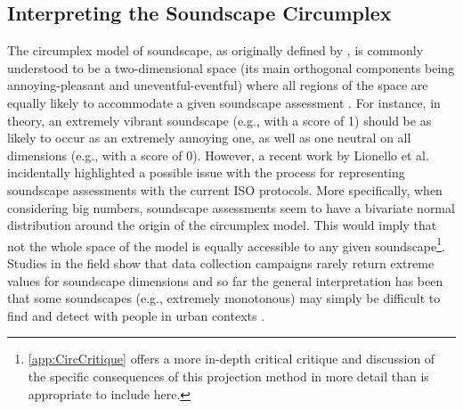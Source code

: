\subsection{Interpreting the Soundscape Circumplex}
The circumplex model of soundscape, as originally defined by \citet{Axelsson2010principal}, is commonly understood to be a two-dimensional space (its main orthogonal components being annoying-pleasant and uneventful-eventful) where all regions of the space are equally likely to accommodate a given soundscape assessment \citep{Aletta2016Soundscape}. For instance, in theory, an extremely vibrant soundscape (e.g., with a score of 1) should be as likely to occur as an extremely annoying one, as well as one neutral on all dimensions (e.g., with a score of 0). However, a recent work by Lionello et al. \citep{Lionello2021Introducing} incidentally highlighted a possible issue with the process for representing soundscape assessments with the current ISO protocols. More specifically, when considering big numbers, soundscape assessments seem to have a bivariate normal distribution around the origin of the circumplex model. This would imply that not the whole space of the model is equally accessible to any given soundscape\footnote{\cref{app:CircCritique} offers a more in-depth critical critique and discussion of the specific consequences of this projection method in more detail than is appropriate to include here.}. Studies in the field show that data collection campaigns rarely return extreme values for soundscape dimensions \citep{Mancini2021Soundwalk} and so far the general interpretation has been that some soundscapes (e.g., extremely monotonous) may simply be difficult to find and detect with people in urban contexts \citep{Sun2019Classification}.

